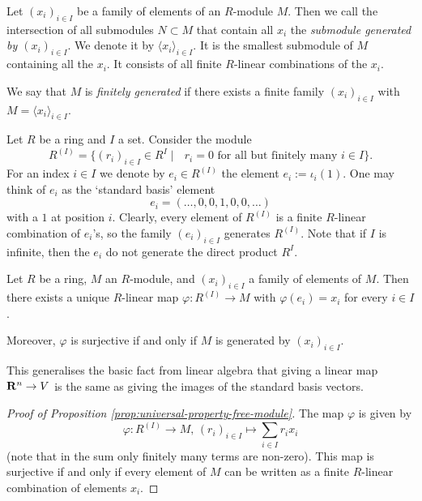\bigskip

Let $(x_i)_{i \in I}$ be a family of elements of an $R$-module $M$. Then we call the intersection of all submodules $N\subset M$ that  contain all $x_i$ the \emph{submodule generated by $(x_i)_{i\in I}$}. We denote it by $\langle x_i \rangle_{i \in I}$.  It is the smallest submodule of $M$ containing all the $x_i$. It consists of all finite $R$-linear combinations of the $x_i$.

We say that $M$ is  \emph{finitely generated} if there exists a finite family $(x_i)_{i\in I}$ with $M=\langle x_i \rangle_{i\in I}$.

\begin{example}\label{ex:free-module}
Let $R$ be a ring and $I$ a set. Consider the module
\[
	R^{(I)}  = \Big\{ (r_i)_{i\in I} \in R^I \mid  \text{  $r_i=0$ for all but finitely many $i\in I$} \Big\}.
\]
For an index $i\in I$ we denote by $e_i \in R^{(I)}$ the element $e_i := \iota_i(1)$. One may think of $e_i$ as the `standard basis' element
\[
	e_i = ( \ldots, 0, 0, 1, 0, 0, \ldots  )
\]
with a $1$ at position $i$.  Clearly, every element of $R^{(I)}$ is a finite $R$-linear combination of $e_i$'s, so the family $(e_i)_{i \in I}$ generates $R^{(I)}$. Note that if $I$ is infinite, then the $e_i$ do not generate the direct product $R^{I}$. 
\end{example}

\begin{proposition}\label{prop:universal-property-free-module}
Let $R$ be a ring, $M$ an $R$-module, and $(x_i)_{i \in I}$ a family of elements of $M$. Then there exists a unique 
$R$-linear map $\varphi\colon R^{(I)} \to M$ with $\varphi(e_i)=x_i$ for every $i\in I$. 

Moreover,  $\varphi$ is surjective if and only if $M$ is generated by $(x_i)_{i\in I}$.
\end{proposition}

This generalises the basic fact from linear algebra that giving a linear map ${\mathbf{R}}^n\to V$ is the same as giving the images of the standard basis vectors.

\begin{proof}[Proof of Proposition \ref{prop:universal-property-free-module}]
The map $\varphi$ is given by
\[
	\varphi\colon R^{(I)} \to M,\, (r_i)_{i\in I} \mapsto \sum_{i\in I} r_i x_i
\]
(note that in the sum only finitely many terms are non-zero). This map is surjective if and only if every
element of $M$ can be written as a finite $R$-linear combination of elements $x_i$.
\end{proof}

